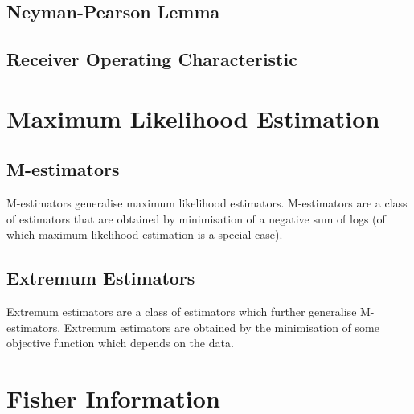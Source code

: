 \documentclass[11pt]{report} %
\begin{document}
\subsection{Neyman-Pearson Lemma}

\subsection{Receiver Operating Characteristic}

\section{Maximum Likelihood Estimation}

\subsection{M-estimators}

M-estimators generalise maximum likelihood estimators. M-estimators are a class of estimators that are obtained by minimisation of a negative sum of logs (of which maximum likelihood estimation is a special case).

\subsection{Extremum Estimators}

Extremum estimators are a class of estimators which further generalise M-estimators. Extremum estimators are obtained by the minimisation of some objective function which depends on the data.

\section{Fisher Information}
\end{document}
